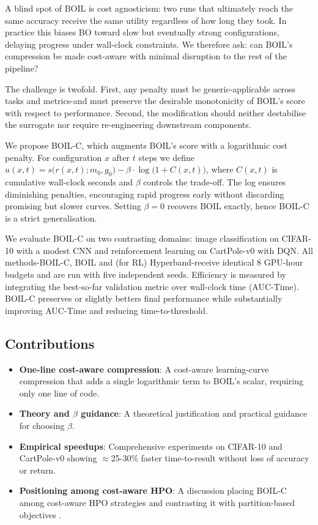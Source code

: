 \documentclass{article} %
\begin{document}
A blind spot of BOIL is cost agnosticism: two runs that ultimately reach the same accuracy receive the same utility regardless of how long they took. In practice this biases BO toward slow but eventually strong configurations, delaying progress under wall-clock constraints. We therefore ask: can BOIL's compression be made cost-aware with minimal disruption to the rest of the pipeline?

The challenge is twofold. First, any penalty must be generic-applicable across tasks and metrics-and must preserve the desirable monotonicity of BOIL's score with respect to performance. Second, the modification should neither destabilise the surrogate nor require re-engineering downstream components.

We propose BOIL-C, which augments BOIL's score with a logarithmic cost penalty. For configuration \(x\) after \(t\) steps we define \(u(x,t) = s\big(r(x,t); m_0, g_0\big) - \beta\cdot \log\big(1 + C(x,t)\big)\), where \(C(x,t)\) is cumulative wall-clock seconds and \(\beta\) controls the trade-off. The log ensures diminishing penalties, encouraging rapid progress early without discarding promising but slower curves. Setting \(\beta=0\) recovers BOIL exactly, hence BOIL-C is a strict generalisation.

We evaluate BOIL-C on two contrasting domains: image classification on CIFAR-10 with a modest CNN and reinforcement learning on CartPole-v0 with DQN. All methods-BOIL-C, BOIL and (for RL) Hyperband-receive identical 8 GPU-hour budgets and are run with five independent seeds. Efficiency is measured by integrating the best-so-far validation metric over wall-clock time (AUC-Time). BOIL-C preserves or slightly betters final performance while substantially improving AUC-Time and reducing time-to-threshold.

\subsection{Contributions}
\begin{itemize}
  \item \textbf{One-line cost-aware compression}: A cost-aware learning-curve compression that adds a single logarithmic term to BOIL's scalar, requiring only one line of code.
  \item \textbf{Theory and \(\beta\) guidance}: A theoretical justification and practical guidance for choosing \(\beta\).
  \item \textbf{Empirical speedups}: Comprehensive experiments on CIFAR-10 and CartPole-v0 showing \(\approx\)25-30\% faster time-to-result without loss of accuracy or return.
  \item \textbf{Positioning among cost-aware HPO}: A discussion placing BOIL-C among cost-aware HPO strategies and contrasting it with partition-based objectives \cite{mlodozeniec-2023-hyperparameter}.
\end{itemize}
\end{document}
